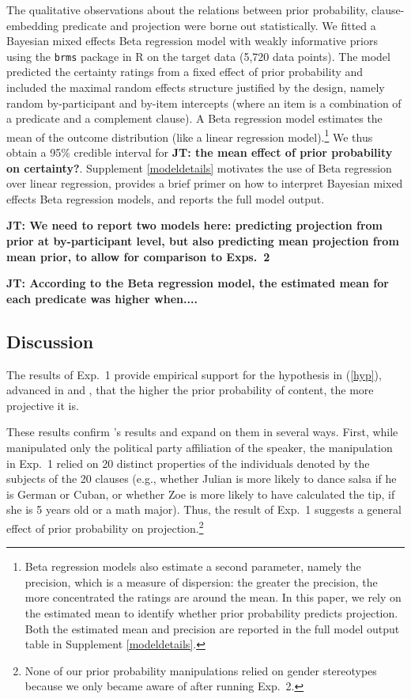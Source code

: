 \documentclass[11pt,fleqn]{article}
\newcommand{\jt}[1]{\textbf{\color{blue}JT: #1}}
\newcommand{\6}{\mbox{$[\hspace*{-.6mm}[$}}
\newcommand{\9}{\mbox{$]\hspace*{-.6mm}]$}}
\newcommand{\citepos}[1]{\citeauthor{#1}'s \citeyear{#1}}
\begin{document}
\newpage

The qualitative observations about the relations between prior probability, clause-embedding predicate and projection were borne out statistically. We fitted a Bayesian mixed effects Beta regression model  with weakly informative priors using the \verb|brms| \cite{buerkner2017}  package in R \cite{R} on the target data (5,720 data points). The model predicted the certainty ratings from a fixed effect of prior probability and included the maximal random effects structure justified by the design, namely random by-participant and by-item intercepts (where an item is a combination of a predicate and a complement clause). A Beta regression model estimates the mean of the outcome distribution (like a linear regression model).\footnote{Beta regression models also estimate a second parameter, namely the precision, which is a measure of dispersion: the greater the precision, the more concentrated the ratings are around the mean. In this paper, we rely on the estimated mean to identify whether prior probability predicts projection. Both the estimated mean and precision are reported in the full model output table in Supplement \ref{modeldetails}.} We thus obtain a 95\% credible interval for \jt{the mean effect of prior probability on certainty?}. Supplement \ref{modeldetails} motivates the use of Beta regression over linear regression, provides a brief primer on how to interpret Bayesian mixed effects Beta regression models, and reports the full model output.

\jt{We need to report two models here: predicting projection from prior at by-participant level, but also predicting mean projection from mean prior, to allow for comparison to Exps.~2}

\jt{According to the Beta regression model, the estimated mean for each predicate was higher when....} 

\subsection{Discussion}

The results of Exp.~1 provide empirical support for the hypothesis in (\ref{hyp}), advanced in  and , that the higher the prior probability of content, the more projective it is. 

These results confirm \citepos{mahler2020} results and expand on them in several ways. First, while  manipulated only the political party affiliation of the speaker, the manipulation in Exp.~1 relied on 20 distinct properties of the individuals denoted by the subjects of the 20 clauses (e.g., whether Julian is more likely to dance salsa if he is German or Cuban, or whether Zoe is more likely to have calculated the tip, if she is 5 years old or a math major). Thus, the result of Exp.~1 suggests a general effect of prior probability on projection.\footnote{None of our prior probability manipulations relied on gender stereotypes because we only became aware of  after running Exp.~2.}
\end{document}
